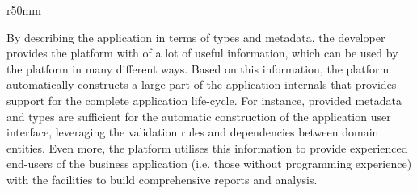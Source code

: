   \begin{wrapfigure}{r}{50mm}
    \vspace{-20pt}
    \centering   
    \vspace{-10pt}
  \end{wrapfigure}

  By describing the application in terms of types and metadata, the developer provides the platform with of a lot of useful information, which can be used by the platform in many different ways.
  Based on this information, the platform automatically constructs a large part of the application internals that provides support for the complete application life-cycle.
  For instance, provided metadata and types are sufficient for the automatic construction of the application user interface, leveraging the validation rules and dependencies between domain entities.
  Even more, the platform utilises this information to provide experienced end-users of the business application (i.e. those without programming experience) with the facilities to build comprehensive reports and analysis.
  
